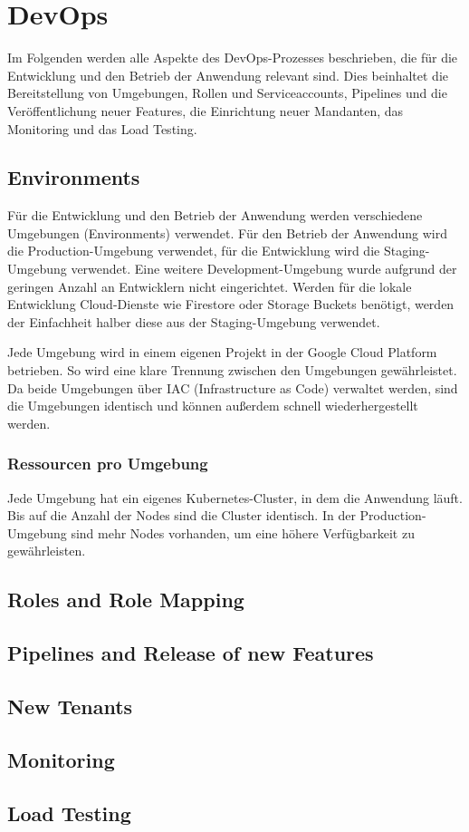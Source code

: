 \section{DevOps}

Im Folgenden werden alle Aspekte des DevOps-Prozesses beschrieben, 
die für die Entwicklung und den Betrieb der Anwendung relevant sind. 
Dies beinhaltet die Bereitstellung von Umgebungen, Rollen und Serviceaccounts, 
Pipelines und die Veröffentlichung neuer Features, die Einrichtung neuer Mandanten, 
das Monitoring und das Load Testing.

\subsection{Environments}

Für die Entwicklung und den Betrieb der Anwendung werden verschiedene Umgebungen (Environments) verwendet.
Für den Betrieb der Anwendung wird die \glqq{}Production\grqq{}-Umgebung verwendet, für 
die Entwicklung wird die \glqq{}Staging\grqq{}-Umgebung verwendet. 
Eine weitere \glqq{}Development\grqq{}-Umgebung wurde aufgrund der geringen Anzahl an Entwicklern 
nicht eingerichtet. Werden für die lokale Entwicklung Cloud-Dienste wie Firestore oder 
Storage Buckets benötigt, werden der Einfachheit halber diese aus der \glqq{}Staging\grqq{}-Umgebung 
verwendet.

Jede Umgebung wird in einem eigenen Projekt in der Google Cloud Platform betrieben.
So wird eine klare Trennung zwischen den Umgebungen gewährleistet.
Da beide Umgebungen über IAC (Infrastructure as Code) verwaltet werden,
sind die Umgebungen identisch und können außerdem schnell wiederhergestellt werden.

\subsubsection{Ressourcen pro Umgebung}

Jede Umgebung hat ein eigenes Kubernetes-Cluster, in dem die Anwendung läuft.
Bis auf die Anzahl der Nodes sind die Cluster identisch. 
In der \glqq{}Production\grqq{}-Umgebung sind mehr Nodes vorhanden, um eine höhere Verfügbarkeit zu gewährleisten.


\subsection{Roles and Role Mapping}
\subsection{Pipelines and Release of new Features}
\subsection{New Tenants}
\subsection{Monitoring}
\subsection{Load Testing}